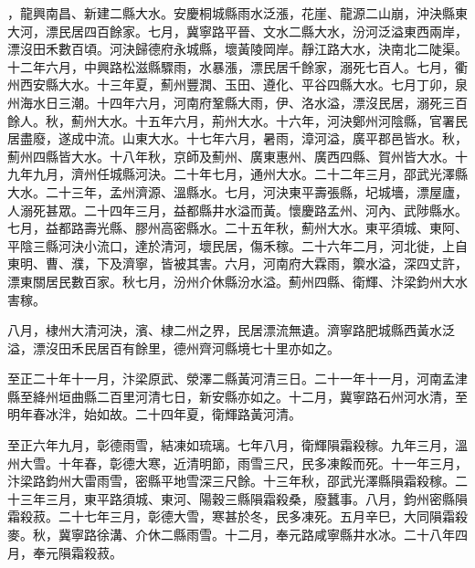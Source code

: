 \begin{pinyinscope}
，龍興南昌、新建二縣大水。安慶桐城縣雨水泛漲，花崖、龍源二山崩，沖決縣東大河，漂民居四百餘家。七月，冀寧路平晉、文水二縣大水，汾河泛溢東西兩岸，漂沒田禾數百頃。河決歸德府永城縣，壞黃陵岡岸。靜江路大水，決南北二陡渠。十二年六月，中興路松滋縣驟雨，水暴漲，漂民居千餘家，溺死七百人。七月，衢州西安縣大水。十三年夏，薊州豐潤、玉田、遵化、平谷四縣大水。七月丁卯，泉州海水日三潮。十四年六月，河南府鞏縣大雨，伊、洛水溢，漂沒民居，溺死三百餘人。秋，薊州大水。十五年六月，荊州大水。十六年，河決鄭州河陰縣，官署民居盡廢，遂成中流。山東大水。十七年六月，暑雨，漳河溢，廣平郡邑皆水。秋，薊州四縣皆大水。十八年秋，京師及薊州、廣東惠州、廣西四縣、賀州皆大水。十九年九月，濟州任城縣河決。二十年七月，通州大水。二十二年三月，邵武光澤縣大水。二十三年，孟州濟源、溫縣水。七月，河決東平壽張縣，圮城墻，漂屋廬，人溺死甚眾。二十四年三月，益都縣井水溢而黃。懷慶路孟州、河內、武陟縣水。七月，益都路壽光縣、膠州高密縣水。二十五年秋，薊州大水。東平須城、東阿、平陰三縣河決小流口，達於清河，壞民居，傷禾稼。二十六年二月，河北徙，上自東明、曹、濮，下及濟寧，皆被其害。六月，河南府大霖雨，籞水溢，深四丈許，漂東關居民數百家。秋七月，汾州介休縣汾水溢。薊州四縣、衛輝、汴梁鈞州大水害稼。



 八月，棣州大清河決，濱、棣二州之界，民居漂流無遺。濟寧路肥城縣西黃水泛溢，漂沒田禾民居百有餘里，德州齊河縣境七十里亦如之。



 至正二十年十一月，汴梁原武、滎澤二縣黃河清三日。二十一年十一月，河南孟津縣至絳州垣曲縣二百里河清七日，新安縣亦如之。十二月，冀寧路石州河水清，至明年春冰泮，始如故。二十四年夏，衛輝路黃河清。



 至正六年九月，彰德雨雪，結凍如琉璃。七年八月，衛輝隕霜殺稼。九年三月，溫州大雪。十年春，彰德大寒，近清明節，雨雪三尺，民多凍餒而死。十一年三月，汴梁路鈞州大雷雨雪，密縣平地雪深三尺餘。十三年秋，邵武光澤縣隕霜殺稼。二十三年三月，東平路須城、東河、陽穀三縣隕霜殺桑，廢蠶事。八月，鈞州密縣隕霜殺菽。二十七年三月，彰德大雪，寒甚於冬，民多凍死。五月辛巳，大同隕霜殺麥。秋，冀寧路徐溝、介休二縣雨雪。十二月，奉元路咸寧縣井水冰。二十八年四月，奉元隕霜殺菽。




\end{pinyinscope}
